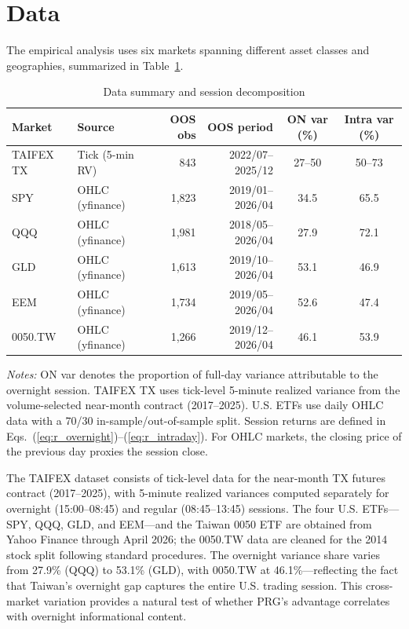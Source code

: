 \documentclass[11pt,a4paper]{article}
\begin{document}
\section{Data}

The empirical analysis uses six markets spanning different asset classes and geographies, summarized in Table~\ref{tab:data}.

\begin{table}[htbp]
\centering
\caption{Data summary and session decomposition}
\label{tab:data}
\small
\begin{tabular}{llrrcc}
\toprule
Market & Source & OOS obs & OOS period & ON var (\%) & Intra var (\%) \\
\midrule
TAIFEX TX  & Tick (5-min RV) & 843  & 2022/07--2025/12 & 27--50 & 50--73 \\
SPY        & OHLC (yfinance) & 1{,}823 & 2019/01--2026/04 & 34.5 & 65.5 \\
QQQ        & OHLC (yfinance) & 1{,}981 & 2018/05--2026/04 & 27.9 & 72.1 \\
GLD        & OHLC (yfinance) & 1{,}613 & 2019/10--2026/04 & 53.1 & 46.9 \\
EEM        & OHLC (yfinance) & 1{,}734 & 2019/05--2026/04 & 52.6 & 47.4 \\
0050.TW    & OHLC (yfinance) & 1{,}266 & 2019/12--2026/04 & 46.1 & 53.9 \\
\bottomrule
\end{tabular}
\begin{flushleft}
\footnotesize
\emph{Notes:} ON var denotes the proportion of full-day variance attributable to the overnight session. TAIFEX TX uses tick-level 5-minute realized variance from the volume-selected near-month contract (2017--2025). U.S. ETFs use daily OHLC data with a 70/30 in-sample/out-of-sample split. Session returns are defined in Eqs.~(\ref{eq:r_overnight})--(\ref{eq:r_intraday}). For OHLC markets, the closing price of the previous day proxies the session close.
\end{flushleft}
\end{table}

The TAIFEX dataset consists of tick-level data for the near-month TX futures contract (2017--2025), with 5-minute realized variances computed separately for overnight (15:00--08:45) and regular (08:45--13:45) sessions. The four U.S. ETFs---SPY, QQQ, GLD, and EEM---and the Taiwan 0050 ETF are obtained from Yahoo Finance through April 2026; the 0050.TW data are cleaned for the 2014 stock split following standard procedures. The overnight variance share varies from 27.9\% (QQQ) to 53.1\% (GLD), with 0050.TW at 46.1\%---reflecting the fact that Taiwan's overnight gap captures the entire U.S. trading session. This cross-market variation provides a natural test of whether PRG's advantage correlates with overnight informational content.
\end{document}
